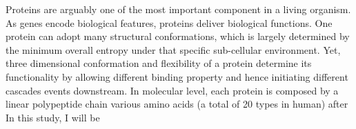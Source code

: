 Proteins are arguably one of the most important component in a living organism. As genes encode biological features, proteins deliver biological functions. One protein can adopt many structural conformations, which is largely determined by the minimum overall entropy under that specific sub-cellular environment. Yet, three dimensional conformation and flexibility of a protein determine its functionality by allowing different binding property and hence initiating different cascades events downstream. In molecular level, each protein is composed by a linear polypeptide chain various amino acids (a total of 20 types in human) after In this study, I will be 